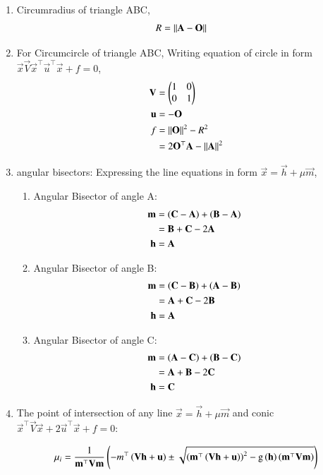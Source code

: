 \documentclass[journal,12pt,twocolumn]{IEEEtran}
\begin{document}
\begin{enumerate}
\item Circumradius of triangle ABC,
	\begin{align}
		R &= \left\lVert\mathbf{A}-\mathbf{O}\right\rVert
	\end{align}
\item For Circumcircle of triangle ABC,
	Writing equation of circle in form $\vec{x}\vec{V}\vec{x}^{\top} 
		\vec{u}^{\top}\vec{x} + f = 0$,
		\begin{align}
			\mathbf{V} &= \begin{pmatrix}1&0\\0&1\end{pmatrix}\\
			\mathbf{u} &= -\mathbf{O}\\
			f &= \left\lVert\mathbf{O}\right\rVert^2 - R^2\\
			&= 2\mathbf{O}^{\top}\mathbf{A} - \left\lVert\mathbf{A}\right\rVert^2
		\end{align}

\item angular bisectors:
	Expressing the line equations in form $\vec{x} = \vec{h} + \mu\vec{m}$,
	\begin{enumerate}
		\item Angular Bisector of angle A:
			\begin{align}
				\mathbf{m} &= \left(\mathbf{C} -\mathbf{A}\right) + \left( \mathbf{B} -\mathbf{A}\right)\\
					&= \mathbf{B} + \mathbf{C} -2\mathbf{A}\\
				\mathbf{h} &= \mathbf{A}
			\end{align}
		\item Angular Bisector of angle B:
			\begin{align}
				\mathbf{m} &= \left(\mathbf{C} -\mathbf{B}\right)+ \left( \mathbf{A} -\mathbf{B}\right)\\
				        &= \mathbf{A} + \mathbf{C} -2\mathbf{B}\\
				\mathbf{h} &= \mathbf{A}
			\end{align}
		\item Angular Bisector of angle C:
			\begin{align}
				\mathbf{m} &= \left(\mathbf{A} -\mathbf{C}\right)+ \left( \mathbf{B} -\mathbf{C}\right)\\
			                &= \mathbf{A} + \mathbf{B} -2\mathbf{C}\\
			\mathbf{h} &= \mathbf{C}
			\end{align}
	\end{enumerate}


\item The point of intersection of any line $\vec{x}= \vec{h} + \mu\vec{m}$ and conic $\vec{x}^{\top}\vec{V}\vec{x} +2\vec{u}^{\top}\vec{x} +f =0$:

	\begin{multline}
        \mu_i = \frac{1}{\mathbf{m}^{\top}\mathbf{V}\mathbf{m}} \left(-m^{\top}\left(\mathbf{V}\mathbf{h}+\mathbf{u}\right) \pm \sqrt{\left(\mathbf{m}^{\top}\left(\mathbf{V}\mathbf{h}+\mathbf{u}\right)\right)^2 - \text{g}\left(\mathbf{h}\right)\left(\mathbf{m}^{\top}\mathbf{V}\mathbf{m}\right)}\right)
\end{multline}


\end{enumerate}
\end{document}
